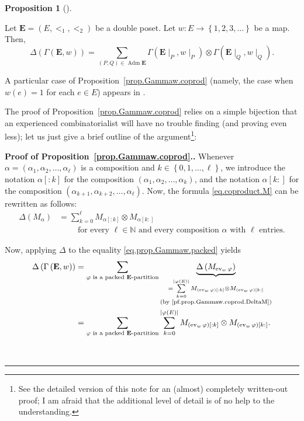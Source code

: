 \documentclass[numbers=enddot,12pt,final,onecolumn,notitlepage,abstracton]{scrartcl}
\theoremstyle{definition}
\newtheorem{prop}[theo]{Proposition}
\newenvironment{proposition}[1][]
{\begin{prop}[#1]\begin{leftbar}}
{\end{leftbar}\end{prop}}
\newenvironment{proof}[1][Proof]{\noindent\textbf{#1.} }{\ \rule{0.5em}{0.5em}}
\let\sumnonlimits\sum
\renewcommand{\sum}{\sumnonlimits\limits}
\newenvironment{vershort}{}{}
\newcommand{\ev}{\operatorname{ev}}
\newcommand{\Adm}{\operatorname{Adm}}
\newcommand{\EE}{{\mathbf{E}}}
\newcommand{\NN}{{\mathbb{N}}}
\begin{document}
\begin{proposition}
\label{prop.Gammaw.coprod}
Let $\EE = \left(E, <_1, <_2\right)$ be a double poset. Let
$w : E \to \left\{1, 2, 3, \ldots\right\}$ be a map.
Then,
\begin{equation}
\label{eq.prop.Gammaw.coprod}
\Delta\left(\Gamma\left(\EE, w\right)\right)
= \sum_{\left(P, Q\right) \in \Adm \EE}
\Gamma\left(\EE\mid_P, w\mid_P\right)
\otimes \Gamma\left(\EE\mid_Q, w\mid_Q\right) .
\end{equation}
\end{proposition}

A particular case of Proposition~\ref{prop.Gammaw.coprod} (namely,
the case when $w\left(e\right) = 1$ for each $e \in E$) appears in
\cite[Th\'eor\`eme 4.16]{Malve-Thesis}.

\begin{vershort}
The proof of Proposition~\ref{prop.Gammaw.coprod} relies on
a simple bijection that an experienced combinatorialist will
have no trouble finding (and proving even less); let us just
give a brief outline of the argument\footnote{See the detailed
version of this note for an (almost) completely written-out
proof; I am afraid that the additional level of detail is of
no help to the understanding.}:

\begin{proof}[Proof of Proposition~\ref{prop.Gammaw.coprod}.]
Whenever
$\alpha = \left(\alpha_1, \alpha_2, \ldots, \alpha_\ell\right)$
is a composition and $k \in \left\{0, 1, \ldots, \ell\right\}$,
we introduce the notation
$\alpha\left[:k\right]$ for the composition
$\left(\alpha_1, \alpha_2, \ldots, \alpha_k\right)$, and the
notation $\alpha\left[k:\right]$ for the composition
$\left(\alpha_{k+1}, \alpha_{k+2}, \ldots, \alpha_\ell\right)$.
Now, the formula \eqref{eq.coproduct.M} can be rewritten as
follows:
\begin{align}
\label{pf.prop.Gammaw.coprod.DeltaM}
\Delta \left( M_\alpha \right)
&= \sum_{k=0}^{\ell} M_{\alpha\left[:k\right]}
\otimes M_{\alpha\left[k:\right]} \\
& \qquad \text{ for every } \ell \in \NN \text{ and every composition } \alpha
\text{ with } \ell \text{ entries.} \nonumber
\end{align}

Now, applying $\Delta$ to the equality
\eqref{eq.prop.Gammaw.packed} yields
\begin{align}
\Delta\left(\Gamma\left(\EE , w\right)\right)
&= \sum_{\varphi \text{ is a packed } \EE\text{-partition}}
\underbrace{\Delta\left(M_{\ev_w \varphi}\right)}_{
  \substack{ = \sum_{k=0}^{\left|\varphi\left(E\right)\right|}
  M_{\left(\ev_w \varphi\right)\left[:k\right]} \otimes
  M_{\left(\ev_w \varphi\right)\left[k:\right]} \\
  \text{(by \eqref{pf.prop.Gammaw.coprod.DeltaM})} }}
 \nonumber \\
&= \sum_{\varphi \text{ is a packed } \EE\text{-partition}}
\sum_{k=0}^{\left|\varphi\left(E\right)\right|}
M_{\left(\ev_w \varphi\right)\left[:k\right]} \otimes
M_{\left(\ev_w \varphi\right)\left[k:\right]} .
\label{pf.Gammaw.coprod.lhs}
\end{align}


\end{proof}
\end{vershort}
\end{document}
